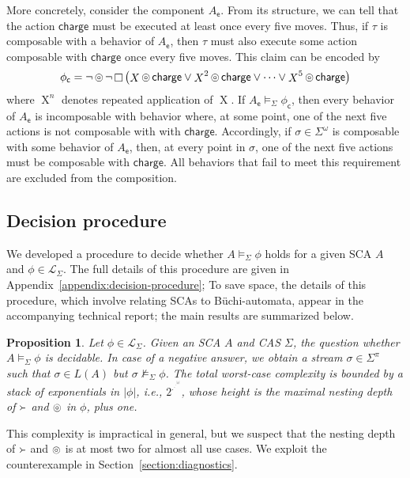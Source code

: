 \documentclass[a4paper]{article}
\newcommand{\buchi}{B\"{u}chi}
\newcommand{\composable}{\mathop{\ocircle}\nolimits}
\newtheorem{proposition}{Proposition}
\theoremstyle{definition}
\newcommand{\charge}{\mathsf{charge}}
\newcommand{\e}{\mathsf{e}}
\newcommand{\cc}{\mathsf{c}}
\newcommand{\nxt}{\mathop{X}\nolimits}
\newcommand{\always}{\mathop{\Box}}
\newcommand{\captures}{\mathop{\Yright}}
\begin{document}
More concretely, consider the component $A_\e$. From its structure, we can tell that the action $\charge$ must be executed at least once every five moves. Thus, if $\tau$ is composable with a behavior of $A_\e$, then $\tau$ must also execute some action composable with $\charge$ once every five moves. This claim can be encoded by
\[
\phi_\cc = \neg \composable \neg \always \left(\nxt \composable \charge \vee \nxt^2 \composable \charge \vee \dots \vee \nxt^5 \composable \charge \right)
\]
where $\nxt^n$ denotes repeated application of $\nxt$. If $A_\e \models_\Sigma \phi_\cc$, then every behavior of $A_\e$ is incomposable with behavior where, at some point, one of the next five actions is not composable with with $\charge$. Accordingly, if $\sigma \in \Sigma^\omega$ is  composable with some behavior of $A_\e$, then, at every point in $\sigma$, one of the next five actions must be composable with $\charge$. All behaviors that fail to meet this requirement are excluded from the composition.

\subsection{Decision procedure}%
\label{section:decision-procedure}

We developed a procedure to decide whether $A \models_\Sigma \phi$ holds for a given SCA $A$ and $\phi \in \mathcal{L}_\Sigma$. 
\iftechreport%
The full details of this procedure are given in Appendix~\ref{appendix:decision-procedure};
\else%
To save space, the details of this procedure, which involve relating SCAs to \buchi-automata, appear in the accompanying technical report;
\fi%
the main results are summarized below.


\begin{proposition}%
\label{proposition:decision-procedure}
Let $\phi \in \mathcal{L}_\Sigma$. Given an SCA $A$ and CAS $\Sigma$, the question whether $A \models_\Sigma \phi$ is decidable. In case of a negative answer, we obtain a stream $\sigma \in \Sigma^\pi$ such that $\sigma \in L(A)$ but $\sigma \not\models_\Sigma \phi$. The total worst-case complexity is bounded by a stack of exponentials in $|\phi|$, i.e., 
\(
2^{.^{.^{.^{|\phi|}}}}
\),
whose height is the maximal nesting depth of $\captures$ and $\composable$ in $\phi$, plus one. 
\end{proposition}
This complexity is impractical in general, but we suspect that the nesting depth of $\captures$ and $\composable$ is at most two for almost all use cases. We exploit the counterexample in Section~\ref{section:diagnostics}.
\end{document}
